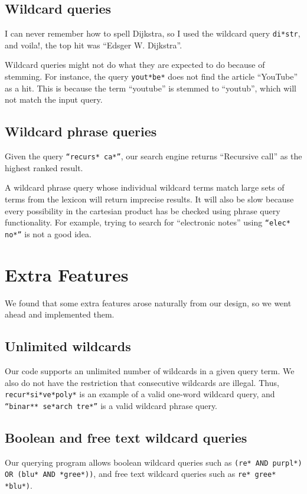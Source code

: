 \documentclass[11pt]{article}
\begin{document}
\subsection{Wildcard queries}

I can never remember how to spell Dijkstra, so I used the wildcard query
\texttt{di*str}, and voila!, the top hit was ``Edsger W. Dijkstra''.

Wildcard queries might not do what they are expected to do because
of stemming. For instance, the query \texttt{yout*be*} does not find
the article ``YouTube'' as a hit. This is because the term ``youtube''
is stemmed to ``youtub'', which will not match the input query.

\subsection{Wildcard phrase queries}

Given the query \texttt{``recurs* ca*''}, our search engine returns
``Recursive call'' as the highest ranked result.

A wildcard phrase query whose individual wildcard terms match large sets
of terms from the lexicon will return imprecise results. It will also be
slow because every possibility in the cartesian product has be checked
using phrase query functionality. For example, trying to search for
``electronic notes'' using \texttt{``elec* no*''} is not a good idea.

\section{Extra Features}

We found that some extra features arose naturally from our design, so we went
ahead and implemented them.

\subsection{Unlimited wildcards}

Our code supports an unlimited number of wildcards in a given query term. We also
do not have the restriction that consecutive wildcards are illegal. Thus,
\texttt{recur*si*ve*poly*} is an example of a valid one-word wildcard query, and
\texttt{``binar** se*arch tre*''} is a valid wildcard phrase query.

\subsection{Boolean and free text wildcard queries}

Our querying program allows boolean wildcard queries such as \texttt{(re* AND purpl*) OR (blu* AND *gree*))}, 
and free text wildcard queries such as \texttt{re* gree* *blu*)}.
\end{document}
